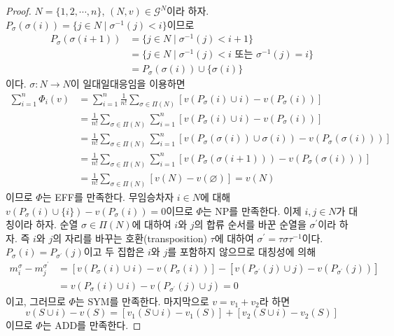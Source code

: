 \documentclass{article}
\numberwithin{equation}{section}
\begin{document}
\begin{proof}
	$N=\{1,2,\cdots,n\}$, $(N,v)\in\mathcal G^N$이라 하자. $P_\sigma(\sigma(i))=\{j\in N\mid\sigma^{-1}(j)<i\}$이므로
	\[
		\begin{aligned}
			P_\sigma(\sigma(i+1))&=\{j\in N\mid\sigma^{-1}(j)<i+1\}\\
			&=\{j\in N\mid\sigma^{-1}(j)<i\text{ 또는 }\sigma^{-1}(j)=i\}\\
			&=P_\sigma(\sigma(i))\cup\{\sigma(i)\}
		\end{aligned}
	\]
	이다. $\sigma:N\to N$이 일대일대응임을 이용하면
	\[
		\begin{aligned}
			\sum_{i=1}^n\Phi_i(v)&=\sum_{i=1}^n\frac{1}{n!}\sum_{\sigma\in\Pi(N)}[v(P_\sigma(i)\cup i)-v(P_\sigma(i))]\\
			&=\frac{1}{n!}\sum_{\sigma\in\Pi(N)}\sum_{i=1}^n[v(P_\sigma(i)\cup i)-v(P_\sigma(i))]\\
			&=\frac{1}{n!}\sum_{\sigma\in\Pi(N)}\sum_{i=1}^n[v(P_\sigma(\sigma(i))\cup\sigma(i))-v(P_\sigma(\sigma(i)))]\\
			&=\frac{1}{n!}\sum_{\sigma\in\Pi(N)}\sum_{i=1}^n[v(P_\sigma(\sigma(i+1)))-v(P_\sigma(\sigma(i)))]\\
			&=\frac{1}{n!}\sum_{\sigma\in\Pi(N)}[v(N)-v(\varnothing)]=v(N)
		\end{aligned}
	\]
	이므로 $\Phi$는 EFF를 만족한다. 무임승차자 $i\in N$에 대해 $v(P_\sigma(i)\cup\{i\})-v(P_\sigma(i))=0$이므로 $\Phi$는 NP를 만족한다. 이제 $i,j\in N$가 대칭이라 하자. 순열 $\sigma\in\Pi(N)$에 대하여 $i$와 $j$의 합류 순서를 바꾼 순열을 $\sigma^\prime$이라 하자. 즉 $i$와 $j$의 자리를 바꾸는 호환(transposition) $\tau$에 대하여 $\sigma^\prime=\tau\sigma\tau^{-1}$이다.  $P_\sigma(i)=P_{\sigma^\prime}(j)$이고 두 집합은 $i$와 $j$를 포함하지 않으므로 대칭성에 의해
	\[
		\begin{aligned}
			m^\sigma_i-m^{\sigma^\prime}_j&=[v(P_\sigma(i)\cup i)-v(P_\sigma(i))]-[v(P_{\sigma^\prime}(j)\cup j)-v(P_{\sigma^\prime}(j))]\\
			&=v(P_\sigma(i)\cup i) -v(P_{\sigma^\prime}(j)\cup j)=0
		\end{aligned}
	\]
	이고, 그러므로 $\Phi$는 SYM를 만족한다. 마지막으로 $v=v_1+v_2$라 하면
	\[
		v(S\cup i)-v(S)=[v_1(S\cup i)-v_1(S)]+[v_2(S\cup i)-v_2(S)]
	\]
	이므로 $\Phi$는 ADD를 만족한다.
\end{proof}
\end{document}
